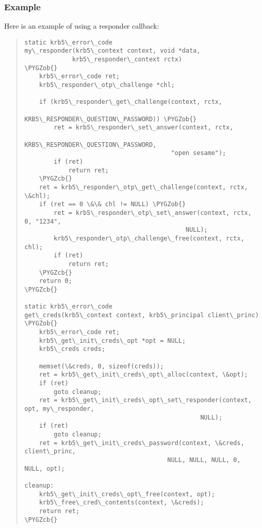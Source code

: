 \documentclass[letterpaper,10pt,english]{sphinxmanual}
\def\PYGZob{\char`\{}
\def\PYGZcb{\char`\}}
\begin{document}
\subsubsection{Example}
\label{appdev/init_creds:example}
Here is an example of using a responder callback:
\begin{quote}

\begin{Verbatim}[commandchars=\\\{\}]
static krb5\_error\_code
my\_responder(krb5\_context context, void *data,
             krb5\_responder\_context rctx)
\PYGZob{}
    krb5\_error\_code ret;
    krb5\_responder\_otp\_challenge *chl;

    if (krb5\_responder\_get\_challenge(context, rctx,
                                     KRB5\_RESPONDER\_QUESTION\_PASSWORD)) \PYGZob{}
        ret = krb5\_responder\_set\_answer(context, rctx,
                                        KRB5\_RESPONDER\_QUESTION\_PASSWORD,
                                        "open sesame");
        if (ret)
            return ret;
    \PYGZcb{}
    ret = krb5\_responder\_otp\_get\_challenge(context, rctx, \&chl);
    if (ret == 0 \&\& chl != NULL) \PYGZob{}
        ret = krb5\_responder\_otp\_set\_answer(context, rctx, 0, "1234",
                                            NULL);
        krb5\_responder\_otp\_challenge\_free(context, rctx, chl);
        if (ret)
            return ret;
    \PYGZcb{}
    return 0;
\PYGZcb{}

static krb5\_error\_code
get\_creds(krb5\_context context, krb5\_principal client\_princ)
\PYGZob{}
    krb5\_error\_code ret;
    krb5\_get\_init\_creds\_opt *opt = NULL;
    krb5\_creds creds;

    memset(\&creds, 0, sizeof(creds));
    ret = krb5\_get\_init\_creds\_opt\_alloc(context, \&opt);
    if (ret)
        goto cleanup;
    ret = krb5\_get\_init\_creds\_opt\_set\_responder(context, opt, my\_responder,
                                                NULL);
    if (ret)
        goto cleanup;
    ret = krb5\_get\_init\_creds\_password(context, \&creds, client\_princ,
                                       NULL, NULL, NULL, 0, NULL, opt);

cleanup:
    krb5\_get\_init\_creds\_opt\_free(context, opt);
    krb5\_free\_cred\_contents(context, \&creds);
    return ret;
\PYGZcb{}
\end{Verbatim}
\end{quote}
\end{document}
